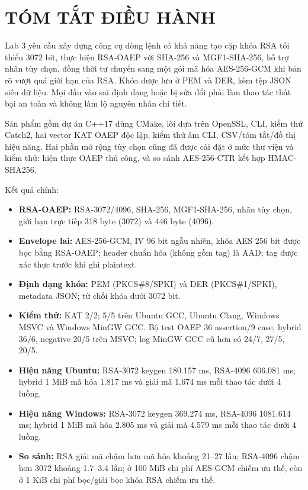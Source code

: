 \documentclass[12pt,a4paper,oneside]{report}
\let\origtexttt\texttt
\renewcommand{\texttt}[1]{\origtexttt{\seqsplit{#1}}}
\begin{document}
\chapter{TÓM TẮT ĐIỀU HÀNH}


Lab 3 yêu cầu xây dựng công cụ dòng lệnh \texttt{rsatool} có khả năng tạo cặp khóa RSA tối thiểu 3072 bit, thực hiện RSA-OAEP với SHA-256 và MGF1-SHA-256, hỗ trợ nhãn tùy chọn, đồng thời tự chuyển sang một gói mã hóa AES-256-GCM khi bản rõ vượt quá giới hạn của RSA. Khóa được lưu ở PEM và DER, kèm tệp JSON siêu dữ liệu. Mọi đầu vào sai định dạng hoặc bị sửa đổi phải làm thao tác thất bại an toàn và không làm lộ nguyên nhân chi tiết.


Sản phẩm gồm dự án C++17 dùng CMake, lõi dựa trên OpenSSL, CLI, kiểm thử Catch2, hai vector KAT OAEP độc lập, kiểm thử âm CLI, CSV/tóm tắt/đồ thị hiệu năng. Hai phần mở rộng tùy chọn cũng đã được cài đặt ở mức thư viện và kiểm thử: hiện thực OAEP thủ công, và so sánh AES-256-CTR kết hợp HMAC-SHA256.


Kết quả chính:


\begin{itemize}[leftmargin=*]
\item \textbf{RSA-OAEP:} RSA-3072/4096, SHA-256, MGF1-SHA-256, nhãn tùy chọn, giới hạn trực tiếp 318 byte (3072) và 446 byte (4096).
\item \textbf{Envelope lai:} AES-256-GCM, IV 96 bit ngẫu nhiên, khóa AES 256 bit được bọc bằng RSA-OAEP; header chuẩn hóa (không gồm tag) là AAD; tag được xác thực trước khi ghi plaintext.
\item \textbf{Định dạng khóa:} PEM (PKCS\#8/SPKI) và DER (PKCS\#1/SPKI), metadata JSON; từ chối khóa dưới 3072 bit.
\item \textbf{Kiểm thử:} KAT 2/2; \texttt{ctest} 5/5 trên Ubuntu GCC, Ubuntu Clang, Windows MSVC và Windows MinGW GCC. Bộ test OAEP 36 assertion/9 case, hybrid 36/6, negative 20/5 trên MSVC; log MinGW GCC cũ hơn có 24/7, 27/5, 20/5.
\item \textbf{Hiệu năng Ubuntu:} RSA-3072 keygen 180.157 ms, RSA-4096 606.081 ms; hybrid 1 MiB mã hóa 1.817 ms và giải mã 1.674 ms mỗi thao tác dưới 4 luồng.
\item \textbf{Hiệu năng Windows:} RSA-3072 keygen 369.274 ms, RSA-4096 1081.614 ms; hybrid 1 MiB mã hóa 2.805 ms và giải mã 4.579 ms mỗi thao tác dưới 4 luồng.
\item \textbf{So sánh:} RSA giải mã chậm hơn mã hóa khoảng 21–27 lần; RSA-4096 chậm hơn 3072 khoảng 1.7–3.4 lần; ở 100 MiB chi phí AES-GCM chiếm ưu thế, còn ở 1 KiB chi phí bọc/giải bọc khóa RSA chiếm ưu thế.
\end{itemize}
\end{document}
